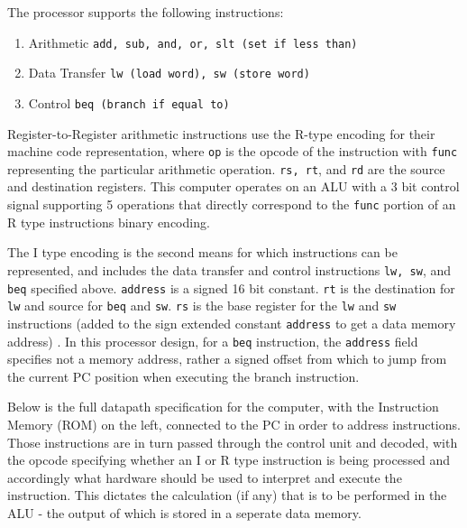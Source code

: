 The processor supports the following instructions:
\begin{enumerate}
    \item Arithmetic \texttt{add, sub, and, or, slt (set if less than)}
    \item Data Transfer \texttt{lw (load word), sw (store word)}
    \item Control \texttt{beq (branch if equal to)}
\end{enumerate} 
Register-to-Register arithmetic instructions use the R-type encoding for their machine code representation, where \texttt{op} is the opcode of the instruction with \texttt{func} representing the particular arithmetic operation. \texttt{rs, rt}, and \texttt{rd} are the source and destination registers. This computer operates on an ALU with a 3 bit control signal supporting 5 operations that directly correspond to the \texttt{func} portion of an R type instructions binary encoding. 

\bigskip


\bigskip

The I type encoding is the second means for which instructions can be represented, and includes the data transfer and control instructions \texttt{lw, sw}, and \texttt{beq} specified above. \texttt{address} is a signed 16 bit constant. \texttt{rt} is the destination for \texttt{lw} and source for \texttt{beq} and \texttt{sw}. \texttt{rs} is the base register for the \texttt{lw} and \texttt{sw} instructions (added to the sign extended constant \texttt{address} to get a data memory address) \textcite{MIPS-uw}. In this processor design, for a \texttt{beq} instruction, the \texttt{address} field specifies not a memory address, rather a signed offset from which to jump from the current PC position when executing the branch instruction.

\bigskip


\bigskip

Below is the full datapath specification for the computer, with the Instruction Memory (ROM) on the left, connected to the PC in order to address instructions. Those instructions are in turn passed through the control unit and decoded, with the opcode specifying whether an I or R type instruction is being processed and accordingly what hardware should be used to interpret and execute the instruction. This dictates the calculation (if any) that is to be performed in the ALU - the output of which is stored in a seperate data memory.

